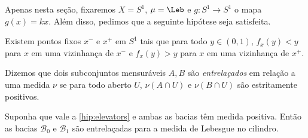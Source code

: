 \documentclass[../fapesp0]{subfiles}
\begin{document}
Apenas nesta seção, fixaremos \(X = S^1\), \(\mu = \Leb\) e \(g \colon S^1 \to S^1\) o mapa \(g(x) = kx\). Além disso, pedimos que a seguinte hipótese seja satisfeita.

\begin{hypothesis}[Elevadores]\label{hip:elevators}
  Existem pontos fixos \(x^-\) e \(x^+\) em \(S^1\) tais que para todo \(y \in (0,1)\), \(f_{x}(y) < y\) para \(x\) em uma vizinhança de \(x^-\) e \(f_x(y) > y\) para \(x\) em uma vizinhança de \(x^+\).
\end{hypothesis}

\begin{definition}
  Dizemos que dois subconjuntos mensuráveis \(A, B\) são \textit{entrelaçados} em relação a uma medida \(\nu\) se para todo aberto \(U\), \(\nu(A \cap U)\) e \(\nu(B \cap U)\) são estritamente positivos.
\end{definition}

\begin{theorem}
  Suponha que vale a \cref{hip:elevators} e ambas as bacias têm medida positiva. Então as bacias \(\mathcal{B}_0\) e \(\mathcal{B}_1\) são entrelaçadas para a medida de Lebesgue no cilindro.
\end{theorem}
\end{document}
